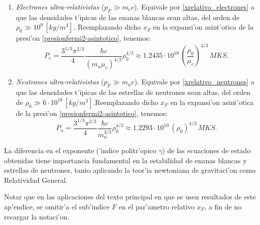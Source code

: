 \begin{enumerate}
\begin{enumerate}
\item \emph{Electrones ultra-relativistas} ($p_F\gg m_{e}c$). Equivale por  \eqref{xrelativo_electrones} a que las densidades t'ipicas de las enanas blancas sean altas, del orden de $\rho_0\gg10^{9}\,[kg/m^3]$. Reemplazando dicho $x_F$ en la expansi'on asint'otica de la presi'on \eqref{presionfermi2-asintotico}, tenemos:
\begin{equation}\label{fermi_relativista}
 \boxed{P_e=\frac{3^{1/3}\pi^{2/3}}{4}\frac{\hbar c}{(m_u\mu_e)^{4/3}}\rho_0^{4/3}\approx1.2435\cdot 10^{10}\,\left(\frac{\rho_0}{\mu_e}\right)^{4/3}\,MKS.}
\end{equation}

\item \emph{Neutrones ultra-relativistas} ($p_F\gg m_{n}c$). Equivale por  \eqref{xrelativo_neutrones} a que las densidades t'ipicas de las estrellas de neutrones sean altas, del orden de $\rho_0\gg6\cdot10^{18}\,[kg/m^3]$.Reemplazando dicho $x_F$ en la expansi'on asint'otica de la presi'on \eqref{presionfermi2-asintotico}, tenemos:
\begin{equation}\label{fermi_relativista2}
 \boxed{P_n=\frac{3^{1/3}\pi^{2/3}}{4}\frac{\hbar c}{m_n^{4/3}}\rho_0^{4/3}\approx1.2293\cdot 10^{10}\,\left(\rho_0\right)^{4/3}\,MKS.}
\end{equation}

\end{enumerate}
\end{enumerate}

La diferencia en el exponente ('indice politr'opico $\gamma$) de las ecuaciones de estado obtenidas tiene importancia fundamental en la estabilidad de enanas blancas y estrellas de neutrones, tanto aplicando la teor'ia newtoniana de gravitaci'on como Relatividad General.

Notar que en las aplicaciones del texto principal en que se usen resultados de este ap'endice, se omitir'a el sub'indice $F$ en el par'ametro relativo $x_F$, a fin de no recargar la notaci'on.
